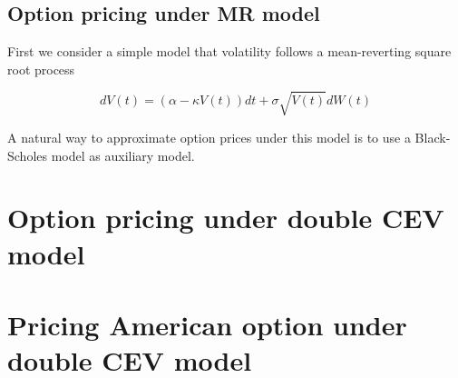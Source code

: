 \subsection{Option pricing under MR model}

First we consider a simple model that volatility follows a mean-reverting square root process

\begin{equation}
    d V(t)=(\alpha-\kappa V(t)) d t+\sigma \sqrt{V(t)} d W(t)
\end{equation}

\noindent A natural way to approximate option prices under this model is to use a Black-Scholes model as auxiliary model.

\section{Option pricing under double CEV model}
\label{sec: 3.2}

\section{Pricing American option under double CEV model}
\label{sec: 3.3}